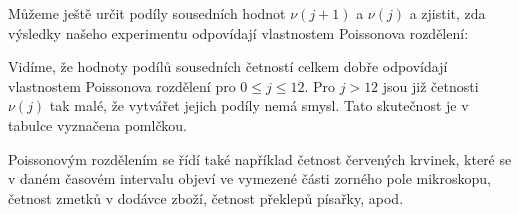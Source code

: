 \begin{example}
  Můžeme ještě určit podíly sousedních hodnot \(\nu(j + 1)\) a \(\nu(j)\) a zjistit, zda výsledky 
  našeho experimentu odpovídají vlastnostem Poissonova rozdělení:
  \begin{table}[ht!]
    \centering
  \end{table}
  \begin{table}[ht!]
    \centering
  \end{table}
  Vidíme, že hodnoty podílů sousedních četností celkem dobře odpovídají vlastnostem Poissonova 
  rozdělení pro \(0 \leq j \leq 12\). Pro \(j > 12\) jsou již četnosti \(\nu(j)\) tak malé, že 
  vytvářet jejich podíly nemá smysl. Tato skutečnost je v tabulce vyznačena pomlčkou.
  
  Poissonovým rozdělením se řídí také například četnost červených krvinek, které se v daném časovém 
  intervalu objeví ve vymezené části zorného pole mikroskopu, četnost zmetků v dodávce zboží, 
  četnost překlepů písařky, apod.  
\normalsize
\end{example}